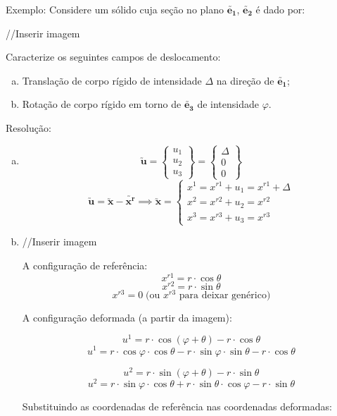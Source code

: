 	Exemplo: Considere um sólido cuja seção no plano $\utilde{\mathbf{e_1}}$, $\utilde{\mathbf{e_2}}$ é dado por:
	
	//Inserir imagem
	
	Caracterize os seguintes campos de deslocamento:
	
	\begin{enumerate}[a)]
		\item Translação de corpo rígido de intensidade $\Delta$ na direção de $\utilde{\mathbf{e_1}}$;
		\item Rotação de corpo rígido em torno de $\utilde{\mathbf{e_3}}$ de intensidade $\varphi$.
	\end{enumerate}
	
	Resolução:
	
	\begin{enumerate}[a)]
		\item
			\[
			\utilde{\mathbf{u}}=
				\begin{Bmatrix}
				u_1 \\ u_2 \\ u_3
				\end{Bmatrix}
				=
				\begin{Bmatrix}
					\Delta \\ 0 \\ 0
				\end{Bmatrix}
			\]
			\[\utilde{\mathbf{u}}=\utilde{\mathbf{x}}-\utilde{\mathbf{x^r}}
			\implies
			\utilde{\mathbf{x}}=
			\begin{cases} x^1=x^{r1}+u_1=x^{r1}+\Delta \\ x^2=x^{r2}+u_2=x^{r2} \\ x^3=x^{r3}+u_3=x^{r3}
			\end{cases}
			\]
		\item
			//Inserir imagem
			
			A configuração de referência:
			\[x^{r1}=r\cdot \cos\theta\]
			\[x^{r2}=r\cdot\sin\theta\]
			\[x^{r3}=0\;\text{(ou }x^{r3}\text{ para deixar genérico})\]
			
			A configuração deformada (a partir da imagem):
			
			\[u^1=r\cdot\cos(\varphi+\theta)-r\cdot\cos\theta\]
			\[u^1=r\cdot\cos\varphi\cdot\cos\theta-r\cdot\sin\varphi\cdot\sin\theta-r\cdot\cos\theta\]
			
			\[u^2=r\cdot\sin(\varphi+\theta)-r\cdot\sin\theta\]
			\[u^2=r\cdot\sin\varphi\cdot\cos\theta+r\cdot\sin\theta\cdot\cos\varphi-r\cdot\sin\theta\]
			
			Substituindo as coordenadas de referência nas coordenadas deformadas:
			

\end{enumerate}

